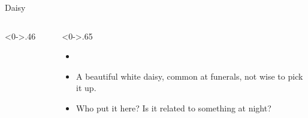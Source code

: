 \documentclass[notheorems]{beamer}
\begin{document}
\begin{framenl}{Daisy}
\begin{columns}[T] %
\begin{column}<0->{.46\textwidth}
\begin{figure}[thpb]
\centering
{}

\end{figure}
\end{column}%
\hfill%
\begin{column}<0->{.65\textwidth}
\begin{itemize}
\item []
\item<1-> A beautiful white daisy, common at funerals, not wise to pick it up.
\item<2-> Who put it here? Is it related to something at night?
\end{itemize}
\end{column}%
\end{columns}
\end{framenl}
\end{document}
